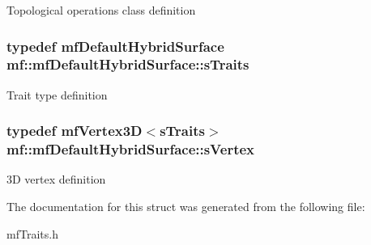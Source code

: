 \label{structmf_1_1mfDefaultHybridSurface_a695260a46e88e543eb52c963c21014a6}
Topological operations class definition \hypertarget{structmf_1_1mfDefaultHybridSurface_a6b7ae8a86c4047ca8a529515dc042449}{
\subsubsection[{sTraits}]{\setlength{\rightskip}{0pt plus 5cm}typedef {\bf mfDefaultHybridSurface} {\bf mf::mfDefaultHybridSurface::sTraits}}}
\label{structmf_1_1mfDefaultHybridSurface_a6b7ae8a86c4047ca8a529515dc042449}
Trait type definition \hypertarget{structmf_1_1mfDefaultHybridSurface_ad0362cd301479efd028b8e30d875332f}{
\subsubsection[{sVertex}]{\setlength{\rightskip}{0pt plus 5cm}typedef {\bf mfVertex3D}$<${\bf sTraits}$>$ {\bf mf::mfDefaultHybridSurface::sVertex}}}
\label{structmf_1_1mfDefaultHybridSurface_ad0362cd301479efd028b8e30d875332f}
3D vertex definition 

The documentation for this struct was generated from the following file:\begin{DoxyCompactItemize}
\item 
mfTraits.h\end{DoxyCompactItemize}
